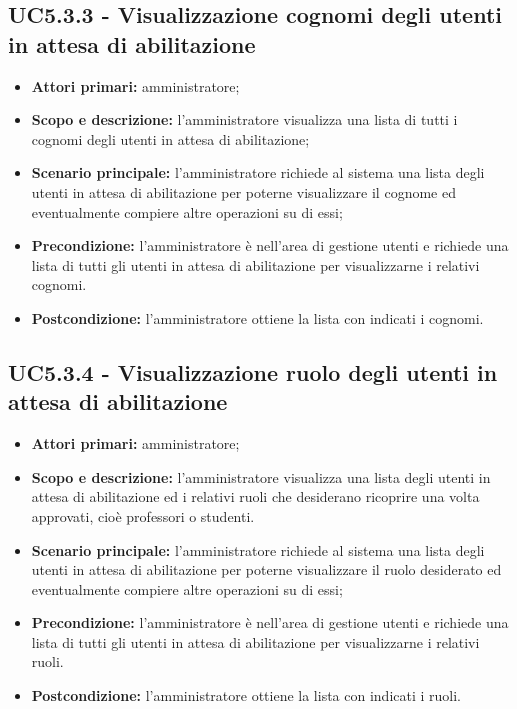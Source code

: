 \documentclass[AnalisiDeiRequisiti.tex]{subfiles}
\begin{document}
\subsection{UC5.3.3 - Visualizzazione cognomi degli utenti in attesa di abilitazione}
\begin{itemize}
	\item \textbf{Attori primari:} amministratore;
	\item \textbf{Scopo e descrizione:} l'amministratore visualizza una lista di tutti i cognomi degli utenti in attesa di abilitazione;
	\item \textbf{Scenario principale:} l'amministratore richiede al sistema una lista degli utenti in attesa di abilitazione per poterne visualizzare il cognome ed eventualmente compiere altre operazioni su di essi;
	\item \textbf{Precondizione:} l'amministratore è nell'area di gestione utenti e richiede una lista di tutti gli utenti in attesa di abilitazione per visualizzarne i relativi cognomi.
	\item \textbf{Postcondizione:} l'amministratore ottiene la lista con indicati i cognomi.
\end{itemize}
\subsection{UC5.3.4 - Visualizzazione ruolo degli utenti in attesa di abilitazione}
\begin{itemize}
	\item \textbf{Attori primari:} amministratore;
	\item \textbf{Scopo e descrizione:} l'amministratore visualizza una lista degli utenti in attesa di abilitazione ed i relativi ruoli che desiderano ricoprire una volta approvati, cioè professori o studenti.
	\item \textbf{Scenario principale:} l'amministratore richiede al sistema una lista degli utenti in attesa di abilitazione per poterne visualizzare il ruolo desiderato ed eventualmente compiere altre operazioni su di essi;
	\item \textbf{Precondizione:} l'amministratore è nell'area di gestione utenti e richiede una lista di tutti gli utenti in attesa di abilitazione per visualizzarne i relativi ruoli.
	\item \textbf{Postcondizione:} l'amministratore ottiene la lista con indicati i ruoli.
\end{itemize}
\end{document}
